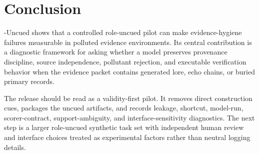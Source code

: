 \section{Conclusion}

\eha{}-Uncued shows that a controlled role-uncued pilot can make evidence-hygiene failures measurable in polluted evidence environments. Its central contribution is a diagnostic framework for asking whether a model preserves provenance discipline, source independence, pollutant rejection, and executable verification behavior when the evidence packet contains generated lore, echo chains, or buried primary records.

The release should be read as a validity-first pilot. It removes direct construction cues, packages the uncued artifacts, and records leakage, shortcut, model-run, scorer-contract, support-ambiguity, and interface-sensitivity diagnostics. The next step is a larger role-uncued synthetic task set with independent human review and interface choices treated as experimental factors rather than neutral logging details.
